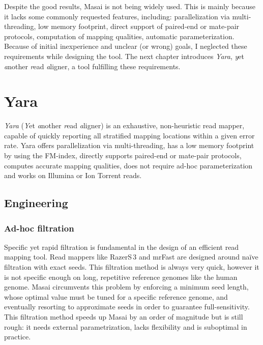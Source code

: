 Despite the good results, Masai is not being widely used.
This is mainly because it lacks some commonly requested features, including:
parallelization via multi-threading, low memory footprint, direct support of paired-end or mate-pair protocols, computation of mapping qualities, automatic parameterization.
Because of initial inexperience and unclear (or wrong) goals, I neglected these requirements while designing the tool.
The next chapter introduces \emph{Yara}, \emph{y}et \emph{a}nother \emph{r}ead \emph{a}ligner, a tool fulfilling these requirements.



\chapter{Yara}
\label{sec:yara}

\emph{Yara} (\emph{Y}et \emph{a}nother \emph{r}ead \emph{a}ligner) is an exhaustive, non-heuristic read mapper, capable of quickly reporting all stratified mapping locations within a given error rate.
Yara offers parallelization via multi-threading, has a low memory footprint by using the FM-index, directly supports paired-end or mate-pair protocols, computes accurate mapping qualities, does not require ad-hoc parameterization and works on Illumina or Ion Torrent reads.


\section{Engineering}
\label{sec:yara:eng}

\subsection{Ad-hoc filtration}
\label{sec:yara:eng:adhoc}

Specific yet rapid filtration is fundamental in the design of an efficient read mapping tool.
Read mappers like RazerS\,3 \citep{RazerS3} and mrFast \citep{Ahmadi2011} are designed around na\"ive filtration with exact seeds.
This filtration method is always very quick, however it is not specific enough on long, repetitive reference genomes like the human genome.
Masai \citep{Siragusa2013} circumvents this problem by enforcing a minimum seed length,
whose optimal value must be tuned for a specific reference genome, and eventually resorting to approximate seeds in order to guarantee full-sensitivity.
This filtration method speeds up Masai by an order of magnitude but is still rough:
it needs external parametrization, lacks flexibility and is suboptimal in practice.

